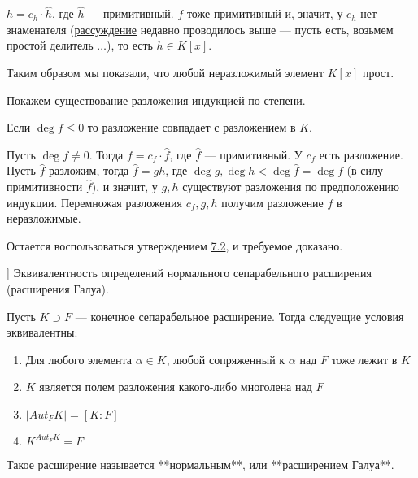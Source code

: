 \begin{solution}
\(h = c_h \cdot \hat{h}\), где \(\hat{h}\) --- примитивный. \(f\) тоже примитивный и, значит, у \(c_h\) нет знаменателя (\hyperlink{9.3.no.denominator}{рассуждение} недавно проводилось выше --- пусть есть, возьмем простой делитель \(\ldots\)), то есть \(h \in K[x]\).

Таким образом мы показали, что любой неразложимый элемент \(K[x]\) прост.

Покажем существование разложения индукцией по степени.

Если \(\deg f \leqslant 0\) то разложение совпадает с разложением в \(K\).

Пусть \(\deg f \ne 0\). Тогда \(f = c_f \cdot \hat{f}\), где \(\hat{f}\) --- примитивный. У \(c_f\) есть разложение. Пусть \(\hat{f}\) разложим, тогда \(\hat{f} = gh\), где \(\deg g, \deg h < \deg \hat{f} = \deg f\) (в силу примитивности \(\hat{f}\)), и значит, у \(g, h\) существуют разложения по предположению индукции. Перемножая разложения \(c_f, g, h\) получим разложение \(f\) в неразложимые.

Остается воспользоваться утверждением \hyperlink{7.2}{7.2}, и требуемое доказано.
\end{solution}

\begin{problem}[7 [Каргальцев]]
Эквивалентность определений нормального сепарабельного расширения (расширения Галуа).

Пусть $K \supset F$ --- конечное сепарабельное расширение.
Тогда следуещие условия эквивалентны:

\begin{enumerate}
    \item Для любого элемента $\alpha \in K$, любой сопряженный к $\alpha$ над $F$ тоже лежит в $K$
    \item $K$ является полем разложения какого-либо многолена над $F$
    \item $|Aut_FK| = [K : F]$
    \item $K^{Aut_FK} = F$
\end{enumerate}

Такое расширение называется **нормальным**, или **расширением Галуа**.

\end{problem}

